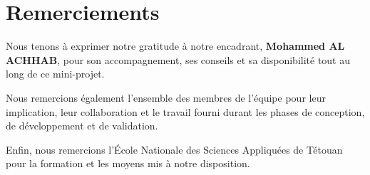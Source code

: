 \section*{Remerciements}

Nous tenons à exprimer notre gratitude à notre encadrant, \textbf{Mohammed AL ACHHAB}, pour son accompagnement, ses conseils et sa disponibilité tout au long de ce mini-projet.

Nous remercions également l'ensemble des membres de l'équipe pour leur implication, leur collaboration et le travail fourni durant les phases de conception, de développement et de validation.

Enfin, nous remercions l'École Nationale des Sciences Appliquées de Tétouan pour la formation et les moyens mis à notre disposition.

\clearpage
